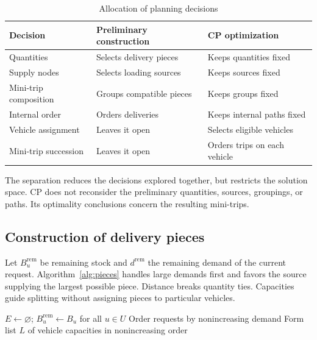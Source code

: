 \begin{table}[htbp]
\centering
\caption{Allocation of planning decisions}\label{tab:decision-allocation}
\begin{tabularx}{\textwidth}{@{}lXX@{}}
\toprule Decision & Preliminary construction & CP optimization \\ \midrule
Quantities & Selects delivery pieces & Keeps quantities fixed \\
Supply nodes & Selects loading sources & Keeps sources fixed \\
Mini-trip composition & Groups compatible pieces & Keeps groups fixed \\
Internal order & Orders deliveries & Keeps internal paths fixed \\
Vehicle assignment & Leaves it open & Selects eligible vehicles \\
Mini-trip succession & Leaves it open & Orders trips on each vehicle \\
\bottomrule
\end{tabularx}
\end{table}

The separation reduces the decisions explored together, but restricts the
solution space. CP does not reconsider the preliminary quantities, sources,
groupings, or paths. Its optimality conclusions concern the resulting mini-trips.

\subsection{Construction of delivery pieces}
Let $B_u^{\mathrm{rem}}$ be remaining stock and $d^{\mathrm{rem}}$ the remaining
demand of the current request. Algorithm~\ref{alg:pieces} handles large demands
first and favors the source supplying the largest possible piece. Distance
breaks quantity ties. Capacities guide splitting without assigning pieces to
particular vehicles.

\begin{algorithm}[htbp]
\SetAlgoLined
{}
$E\gets\varnothing$; $B_u^{\mathrm{rem}}\gets B_u$ for all $u\in U$\;
Order requests by nonincreasing demand\;
Form list $L$ of vehicle capacities in nonincreasing order\;
\;
\caption{Demand splitting and supply-node selection}\label{alg:pieces}
\end{algorithm}

